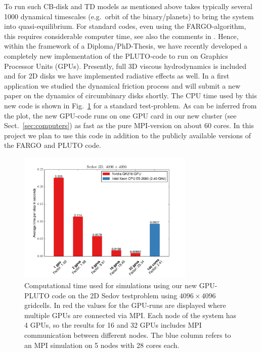 \documentclass[10pt,fleqn,twoside]{article}
\begin{document}
To run such CB-disk and TD models as mentioned above \citep{2013A&A...560A..40M}
takes typically several 1000 dynamical timescales (e.g.\ orbit of the binary/planets) to bring the system
into quasi-equilibrium. For standard codes, even using the FARGO-algorithm, this requires considerable
computer time, see also the comments in \citet{2011ApJ...729...47Z}. Hence, within the
framework of a Diploma/PhD-Thesis, we have recently
developed a completely new implementation of the PLUTO-code to run on Graphics Processor Units (GPUs).
Presently, full 3D viscous hydrodynamics is included and for 2D disks we have implemented
radiative effects as well. In a first application we studied the dynamical friction process
\citep{2016A&A...589A..10T} and will submit a new paper on the dynamics of circumbinary disks shortly.
The CPU time used by this new code is shown in Fig.~\ref{fig:cpu} for a standard test-problem.
As can be inferred from the plot, the new GPU-code runs on one GPU card in our new cluster (see Sect.~\ref{sec:computers})
as fast as the pure MPI-version on about 60 cores.
In this project we plan to use this code in addition to the publicly available versions of the FARGO and PLUTO code.

\begin{figure}[t]
\centerline{\includegraphics[width=0.75\textwidth]{pics/sedov2d_scaling.pdf}}
\caption{\label{fig:cpu} Computational time used for simulations using our new GPU-PLUTO code
on the 2D Sedov testproblem using $4096 \times 4096$ gridcells.
In red the values for the GPU-runs are displayed where multiple GPUs are connected via
MPI. Each node of the system has 4 GPUs, so the results for 16 and 32 GPUs includes MPI communication
between different nodes. The blue column refers to an MPI simulation on 5 nodes with 28 cores each.
} 
\end{figure}
%
\end{document}
